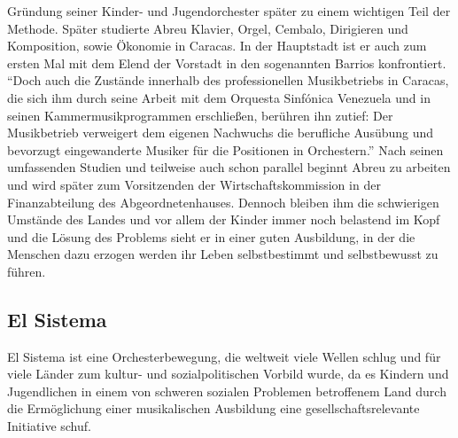 Gründung seiner Kinder- und Jugendorchester später zu einem wichtigen Teil der
Methode. Später studierte Abreu Klavier, Orgel, Cembalo, Dirigieren und
Komposition, sowie Ökonomie in Caracas. In der Hauptstadt ist er auch zum ersten
Mal mit dem Elend der Vorstadt in den sogenannten Barrios konfrontiert. \enquote{Doch
auch die Zustände innerhalb des professionellen Musikbetriebs in Caracas, die
sich ihm durch seine Arbeit mit dem Orquesta Sinfónica Venezuela und in seinen
Kammermusikprogrammen erschließen, berühren ihn zutief: Der Musikbetrieb
verweigert dem eigenen Nachwuchs die berufliche Ausübung und bevorzugt
eingewanderte Musiker für die Positionen in
Orchestern.}\autocite[28]{kaufmann:el_sistema} Nach seinen umfassenden Studien
und teilweise auch schon parallel beginnt Abreu zu arbeiten und wird später
zum Vorsitzenden der Wirtschaftskommission in der Finanzabteilung des
Abgeordnetenhauses. Dennoch bleiben ihm die schwierigen Umstände des Landes und
vor allem der Kinder immer noch belastend im Kopf und die Lösung des Problems
sieht er in einer guten Ausbildung, in der die Menschen dazu erzogen werden ihr
Leben selbstbestimmt und selbstbewusst zu
führen.\autocite[31]{kaufmann:el_sistema} 



\subsection{El Sistema}
El Sistema ist eine Orchesterbewegung, die weltweit viele Wellen schlug und für
viele Länder zum kultur- und sozialpolitischen Vorbild wurde, da es Kindern und
Jugendlichen in einem von schweren sozialen Problemen betroffenem Land durch die
Ermöglichung einer musikalischen Ausbildung eine gesellschaftsrelevante
Initiative schuf. 

